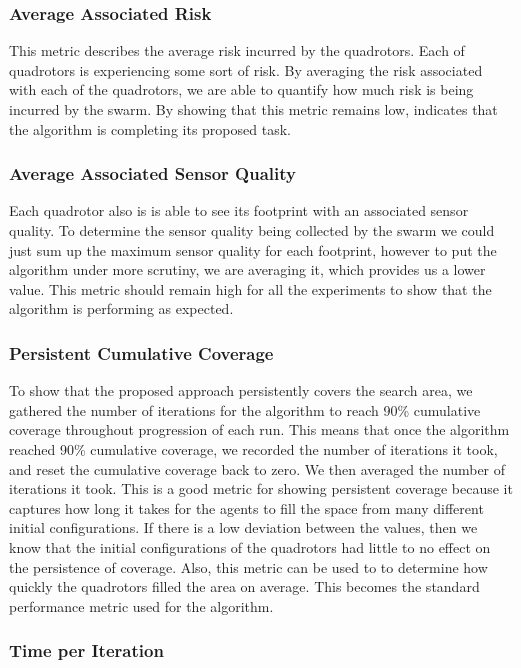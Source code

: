 \documentclass{article}
\begin{document}
\subsubsection{Average Associated Risk}

This metric describes the average risk incurred by the quadrotors. Each of
quadrotors is experiencing some sort of risk. By averaging the risk associated
with each of the quadrotors, we are able to quantify how much risk is being
incurred by the swarm. By showing that this metric remains low, indicates that
the algorithm is completing its proposed task.

\subsubsection{Average Associated Sensor Quality}

Each quadrotor also is is able to see its footprint with an associated sensor
quality. To determine the sensor quality being collected by the swarm we could
just sum up the maximum sensor quality for each footprint, however to put the
algorithm under more scrutiny, we are averaging it, which provides us a lower
value. This metric should remain high for all the experiments to show that the
algorithm is performing as expected.


\subsubsection{Persistent Cumulative Coverage}

To show that the proposed approach persistently covers the search area, we
gathered the number of iterations for the algorithm to reach 90\% cumulative
coverage throughout progression of each run. This means that once the algorithm
reached 90\% cumulative coverage, we recorded the number of iterations it took,
and reset the cumulative coverage back to zero. We then averaged the number of
iterations it took. This is a good metric for showing persistent coverage
because it captures how long it takes for the agents to fill the space from
many different initial configurations. If there is a low deviation between the
values, then we know that the initial configurations of the quadrotors had
little to no effect on the persistence of coverage. Also, this metric can be
used to to determine how quickly the quadrotors filled the area on average.
This becomes the standard performance metric used for the algorithm.

\subsubsection{Time per Iteration}
\end{document}
